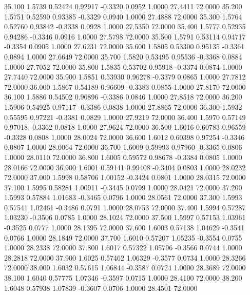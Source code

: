   35.100   1.5739   0.52424   0.92917  -0.3320   0.0952   1.0000  27.4411  72.0000
  35.200   1.5751   0.52590   0.93385  -0.3329   0.0940   1.0000  27.4888  72.0000
  35.300   1.5764   0.52760   0.93842  -0.3338   0.0928   1.0000  27.5350  72.0000
  35.400   1.5777   0.52935   0.94286  -0.3346   0.0916   1.0000  27.5798  72.0000
  35.500   1.5791   0.53114   0.94717  -0.3354   0.0905   1.0000  27.6231  72.0000
  35.600   1.5805   0.53300   0.95135  -0.3361   0.0894   1.0000  27.6649  72.0000
  35.700   1.5820   0.53495   0.95536  -0.3368   0.0884   1.0000  27.7052  72.0000
  35.800   1.5835   0.53702   0.95918  -0.3374   0.0874   1.0000  27.7440  72.0000
  35.900   1.5851   0.53930   0.96278  -0.3379   0.0865   1.0000  27.7812  72.0000
  36.000   1.5867   0.54189   0.96609  -0.3383   0.0855   1.0000  27.8170  72.0000
  36.100   1.5886   0.54502   0.96896  -0.3386   0.0846   1.0000  27.8518  72.0000
  36.200   1.5906   0.54925   0.97117  -0.3386   0.0838   1.0000  27.8865  72.0000
  36.300   1.5932   0.55595   0.97221  -0.3381   0.0829   1.0000  27.9219  72.0000
  36.400   1.5970   0.57149   0.97018  -0.3362   0.0818   1.0000  27.9624  72.0000
  36.500   1.6016   0.60783   0.96559  -0.3328   0.0808   1.0000  28.0024  72.0000
  36.600   1.6012   0.60398   0.97254  -0.3346   0.0807   1.0000  28.0064  72.0000
  36.700   1.6009   0.59993   0.97960  -0.3365   0.0806   1.0000  28.0110  72.0000
  36.800   1.6005   0.59572   0.98678  -0.3384   0.0805   1.0000  28.0166  72.0000
  36.900   1.6001   0.59141   0.99408  -0.3404   0.0803   1.0000  28.0232  72.0000
  37.000   1.5998   0.58706   1.00152  -0.3424   0.0801   1.0000  28.0315  72.0000
  37.100   1.5995   0.58281   1.00911  -0.3445   0.0799   1.0000  28.0421  72.0000
  37.200   1.5993   0.57884   1.01683  -0.3465   0.0796   1.0000  28.0561  72.0000
  37.300   1.5993   0.57541   1.02461  -0.3486   0.0791   1.0000  28.0753  72.0000
  37.400   1.5994   0.57287   1.03230  -0.3506   0.0785   1.0000  28.1024  72.0000
  37.500   1.5997   0.57153   1.03961  -0.3525   0.0777   1.0000  28.1395  72.0000
  37.600   1.6003   0.57138   1.04629  -0.3541   0.0766   1.0000  28.1849  72.0000
  37.700   1.6010   0.57207   1.05235  -0.3554   0.0755   1.0000  28.2338  72.0000
  37.800   1.6017   0.57322   1.05796  -0.3566   0.0744   1.0000  28.2818  72.0000
  37.900   1.6025   0.57462   1.06329  -0.3577   0.0734   1.0000  28.3266  72.0000
  38.000   1.6032   0.57615   1.06844  -0.3587   0.0724   1.0000  28.3689  72.0000
  38.100   1.6040   0.57775   1.07346  -0.3597   0.0715   1.0000  28.4100  72.0000
  38.200   1.6048   0.57938   1.07839  -0.3607   0.0706   1.0000  28.4501  72.0000
